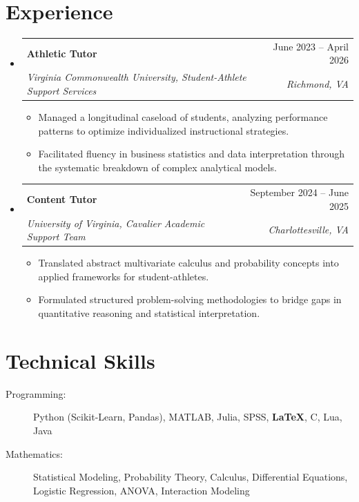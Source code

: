 \documentclass[letterpaper,11pt]{article}
\makeatletter
\newcommand{\resumeItem}[1]{
  \item\small{
    {#1 \vspace{-2pt}}
  }
}
\newcommand{\resumeSubheading}[4]{
  \vspace{-2pt}\item
    \begin{tabular*}{0.97\textwidth}[t]{l@{\extracolsep{\fill}}r}
      \textbf{#1} & #2 \\
      \textit{\small#3} & \textit{\small #4} \\
    \end{tabular*}\vspace{-7pt}
}
\newcommand{\resumeSubHeadingListStart}{\begin{itemize}[leftmargin=0.15in, label={}]}
\newcommand{\resumeSubHeadingListEnd}{\end{itemize}}
\newcommand{\resumeItemListStart}{\begin{itemize}}
\newcommand{\resumeItemListEnd}{\end{itemize}\vspace{-5pt}}
\makeatother
\begin{document}
\section{Experience}
  \resumeSubHeadingListStart

    \resumeSubheading
      {Athletic Tutor}{June 2023 -- April 2026}
      {Virginia Commonwealth University, Student-Athlete Support Services}{Richmond, VA}
      \resumeItemListStart
        \resumeItem{Managed a longitudinal caseload of students, analyzing performance patterns to optimize individualized instructional strategies.}
        \resumeItem{Facilitated fluency in business statistics and data interpretation through the systematic breakdown of complex analytical models.}
      \resumeItemListEnd
      

    \resumeSubheading
      {Content Tutor}{September 2024 -- June 2025}
      {University of Virginia, Cavalier Academic Support Team}{Charlottesville, VA}
      \resumeItemListStart
        \resumeItem{Translated abstract multivariate calculus and probability concepts into applied frameworks for student-athletes.}
        \resumeItem{Formulated structured problem-solving methodologies to bridge gaps in quantitative reasoning and statistical interpretation.}
        
    \resumeItemListEnd


  \resumeSubHeadingListEnd




%
\section{Technical Skills}
 \begin{description}
    \item[Programming:] Python (Scikit-Learn, Pandas), MATLAB, Julia, SPSS, \textbf{\LaTeX}, C, Lua, Java
    \item[Mathematics:] Statistical Modeling, Probability Theory, Calculus, Differential Equations, Logistic Regression, ANOVA, Interaction Modeling
\end{description}


\end{document}
